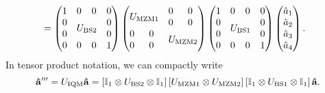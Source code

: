\begin{equation}
\begin{split}
		\\
		&=
		\begin{pmatrix}
			 1 & 0 & 0 & 0 \\
			 0 & \multicolumn{2}{c}{\multirow{2}{*}{$U_\text{BS2}$}} & 0 \\
			 0 & & & 0 \\
			 0 & 0 & 0 & 1
		\end{pmatrix}
		\begin{pmatrix}
			 \multicolumn{2}{c}{\multirow{2}{*}{$U_\text{MZM1}$}} & 0 & 0 \\
			 & & 0 & 0 \\
			 0 & 0 & \multicolumn{2}{c}{\multirow{2}{*}{$U_\text{MZM2}$}} \\
			 0 & 0 & & \\
		\end{pmatrix}
		\begin{pmatrix}
			 1 & 0 & 0 & 0 \\
			 0 & \multicolumn{2}{c}{\multirow{2}{*}{$U_\text{BS1}$}} & 0 \\
			 0 & & & 0 \\
			 0 & 0 & 0 & 1
		\end{pmatrix}
		\begin{pmatrix}
			\hat{a}_1 \\
			\hat{a}_2 \\
			\hat{a}_3 \\
			\hat{a}_4
		\end{pmatrix}
		.
	\end{split}
\end{equation}
In tensor product notation, we can compactly write
\begin{equation}
	\vb{\hat{a}}^{\prime\prime\prime}
	=
	U_\text{IQM}
	\vb{\hat{a}}
	=
	\left[
		\mathbb{I}_1
		\otimes
		U_\text{BS2}
		\otimes
		\mathbb{I}_1
	\right]
	\left[
		U_\text{MZM1}
		\otimes
		U_\text{MZM2}
	\right]
	\left[
		\mathbb{I}_1
		\otimes
		U_\text{BS1}
		\otimes
		\mathbb{I}_1
	\right]
	\vb{\hat{a}}
	.
\end{equation}

